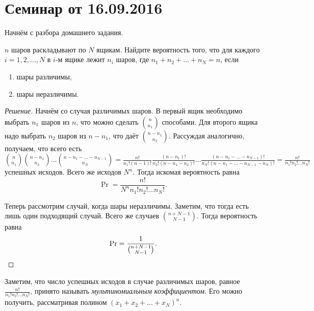 \section{Семинар от 16.09.2016}
Начнём с разбора домашнего задания.
\begin{problem}
    \(n\) шаров раскладывают по \(N\) ящикам. Найдите вероятность того, что для каждого \(i = 1, 2, \ldots, N\) в \(i\)-м ящике лежит \(n_i\) шаров, где \(n_1 + n_2 + \ldots + n_N = n\), если
    \begin{enumerate}
        \item шары различимы,
        \item шары неразличимы.
    \end{enumerate}
\end{problem}
\begin{proof}[Решение]
    Начнём со случая различимых шаров. В первый ящик необходимо выбрать \(n_1\) шаров из \(n\), что можно сделать \(\binom{n}{n_1}\) способами. Для второго ящика надо выбрать \(n_2\) шаров из \(n - n_1\), что даёт \(\binom{n - n_1}{n_2}\). Рассуждая аналогично, получаем, что всего есть \(\binom{n}{n_1}\binom{n - n_1}{n_2} \ldots \binom{n - n_1 - \ldots - n_{N - 1}}{n_{N}} = \frac{n!}{n_{1}!(n - 1)!}\frac{(n - n_1)!}{n_2!(n - n_1 - n_2)!}\ldots\frac{(n - n_1 - \ldots - n_{N - 1})!}{n_N!(n - n_1 - \ldots - n_{N - 1} - n_N)!} = \frac{n!}{n_{1}!n_{2}!\ldots n_{N}!}\) успешных исходов. Всего же исходов \(N^{n}\). Тогда искомая вероятность равна \[\Pr = \frac{n!}{N^{n}n_{1}!n_{2}!\ldots n_{N}!}.\]
    
    Теперь рассмотрим случай, когда шары неразличимы. Заметим, что тогда есть лишь один подходящий случай. Всего же случаев \(\binom{n + N - 1}{N - 1}\). Тогда вероятность равна \[\Pr = \frac{1}{\binom{n + N - 1}{N - 1}}.\qedhere\]
\end{proof}
\begin{remark}
    Заметим, что число успешных исходов в случае различимых шаров, равное \(\frac{n!}{n_{1}!n_{2}!\ldots n_{N}!}\), принято называть \emph{мультиномиальным коэффициентом}. Его можно получить, рассматривая полином \((x_1 + x_2 + \ldots + x_N)^{n}\).
\end{remark}

